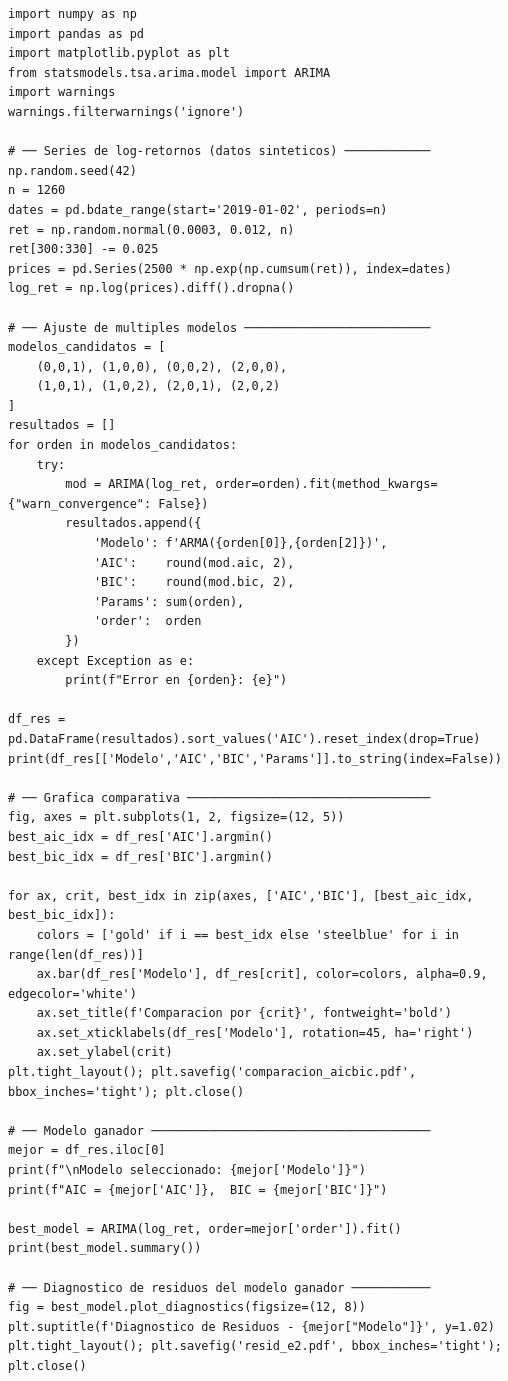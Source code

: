 \documentclass[12pt, a4paper]{article}
\begin{document}
\begin{lstlisting}[caption={Ejemplo 2: Comparación de modelos con AIC y BIC},
                   label={lst:e2}]
import numpy as np
import pandas as pd
import matplotlib.pyplot as plt
from statsmodels.tsa.arima.model import ARIMA
import warnings
warnings.filterwarnings('ignore')

# ── Series de log-retornos (datos sinteticos) ────────────
np.random.seed(42)
n = 1260
dates = pd.bdate_range(start='2019-01-02', periods=n)
ret = np.random.normal(0.0003, 0.012, n)
ret[300:330] -= 0.025
prices = pd.Series(2500 * np.exp(np.cumsum(ret)), index=dates)
log_ret = np.log(prices).diff().dropna()

# ── Ajuste de multiples modelos ──────────────────────────
modelos_candidatos = [
    (0,0,1), (1,0,0), (0,0,2), (2,0,0),
    (1,0,1), (1,0,2), (2,0,1), (2,0,2)
]
resultados = []
for orden in modelos_candidatos:
    try:
        mod = ARIMA(log_ret, order=orden).fit(method_kwargs={"warn_convergence": False})
        resultados.append({
            'Modelo': f'ARMA({orden[0]},{orden[2]})',
            'AIC':    round(mod.aic, 2),
            'BIC':    round(mod.bic, 2),
            'Params': sum(orden),
            'order':  orden
        })
    except Exception as e:
        print(f"Error en {orden}: {e}")

df_res = pd.DataFrame(resultados).sort_values('AIC').reset_index(drop=True)
print(df_res[['Modelo','AIC','BIC','Params']].to_string(index=False))

# ── Grafica comparativa ──────────────────────────────────
fig, axes = plt.subplots(1, 2, figsize=(12, 5))
best_aic_idx = df_res['AIC'].argmin()
best_bic_idx = df_res['BIC'].argmin()

for ax, crit, best_idx in zip(axes, ['AIC','BIC'], [best_aic_idx, best_bic_idx]):
    colors = ['gold' if i == best_idx else 'steelblue' for i in range(len(df_res))]
    ax.bar(df_res['Modelo'], df_res[crit], color=colors, alpha=0.9, edgecolor='white')
    ax.set_title(f'Comparacion por {crit}', fontweight='bold')
    ax.set_xticklabels(df_res['Modelo'], rotation=45, ha='right')
    ax.set_ylabel(crit)
plt.tight_layout(); plt.savefig('comparacion_aicbic.pdf', bbox_inches='tight'); plt.close()

# ── Modelo ganador ───────────────────────────────────────
mejor = df_res.iloc[0]
print(f"\nModelo seleccionado: {mejor['Modelo']}")
print(f"AIC = {mejor['AIC']},  BIC = {mejor['BIC']}")

best_model = ARIMA(log_ret, order=mejor['order']).fit()
print(best_model.summary())

# ── Diagnostico de residuos del modelo ganador ───────────
fig = best_model.plot_diagnostics(figsize=(12, 8))
plt.suptitle(f'Diagnostico de Residuos - {mejor["Modelo"]}', y=1.02)
plt.tight_layout(); plt.savefig('resid_e2.pdf', bbox_inches='tight'); plt.close()
\end{lstlisting}
\end{document}

